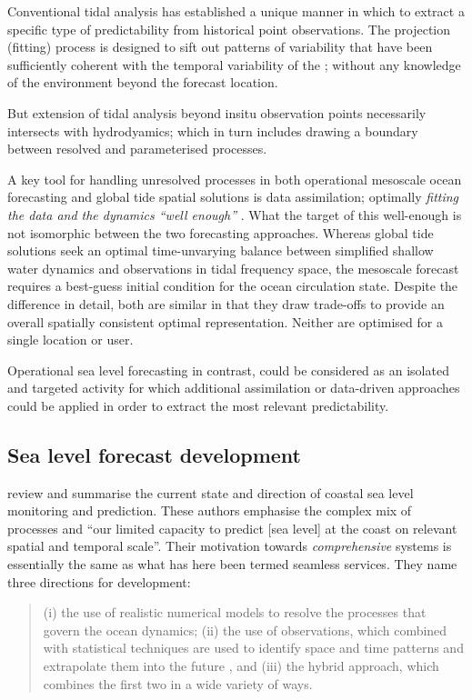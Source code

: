 Conventional tidal analysis has established a unique manner in which to extract a specific type of predictability from historical point observations.
The projection (fitting) process is designed to sift out patterns of variability that have been sufficiently coherent with the temporal variability of the \ATGP{}; without any knowledge of the environment beyond the forecast location.

But extension of tidal analysis beyond insitu observation points necessarily intersects with hydrodyamics; which in turn includes drawing a boundary between resolved and parameterised processes.  

A key tool for handling unresolved processes in both operational mesoscale ocean forecasting and global tide spatial solutions is data assimilation; optimally \textit{fitting the data and the dynamics ``well enough''} \citep{Egbert:1994wz}. 
What the target of this well-enough is not isomorphic between the two forecasting approaches.
Whereas global tide solutions seek an optimal time-unvarying balance between simplified shallow water dynamics and observations in tidal frequency space, the mesoscale forecast requires a best-guess initial condition for the ocean circulation state.  
Despite the difference in detail, both are similar in that they draw trade-offs to provide an overall spatially consistent optimal representation.   Neither are optimised for a single location or user.

Operational sea level forecasting in contrast, could be considered as an isolated and targeted activity for which additional assimilation or data-driven approaches could be applied in order to extract the most relevant predictability. 

\subsection{Sea level forecast development}
\cite{10.3389/fmars.2019.00437} review and summarise the current state and direction of coastal sea level monitoring and prediction.   These authors emphasise the complex mix of processes and ``our limited capacity to predict [sea level] at the coast on relevant spatial and temporal scale''.
Their motivation towards \emph{comprehensive} systems is essentially the same as what has here been termed seamless services. 
They name three directions for development:
\begin{quote}
(i) the use of realistic numerical models to resolve the processes that govern the ocean dynamics; (ii) the use of observations, which combined with statistical techniques are used to identify space and time patterns and extrapolate them into the future , and (iii) the hybrid approach, which combines the first two in a wide variety of ways.
\end{quote} 

